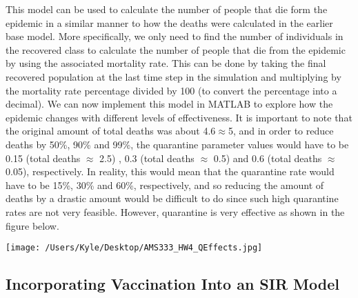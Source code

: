 \documentclass[12pt]{article}
\begin{document}
This model can be used to calculate the number of people that die form the epidemic in a similar manner to how the deaths were calculated in the earlier base model. More specifically, we only need to find the number of individuals in the recovered class to calculate the number of people that die from the epidemic by using the associated mortality rate. This can be done by taking the final recovered population at the last time step in the simulation and multiplying by the mortality rate percentage divided by 100 (to convert the percentage into a decimal). We can now implement this model in MATLAB to explore how the epidemic changes with different levels of effectiveness. It is important to note that the original amount of total deaths was about 4.6$\approx$5, and in order to reduce deaths by 50\%, 90\% and 99\%, the quarantine parameter values would have to be 0.15 (total deaths $\approx$ 2.5) , 0.3 (total deaths $\approx$ 0.5) and 0.6 (total deaths $\approx$ 0.05), respectively. In reality, this would mean that the quarantine rate would have to be 15\%, 30\% and 60\%, respectively, and so reducing the amount of deaths by a drastic amount would be difficult to do since such high quarantine rates are not very feasible. However, quarantine is very effective as shown in the figure below.  
\begin{center}
   \texttt{[image: /Users/Kyle/Desktop/AMS333\_HW4\_QEffects.jpg]}
\end{center}

\subsection*{Incorporating Vaccination Into an SIR Model}
\end{document}
